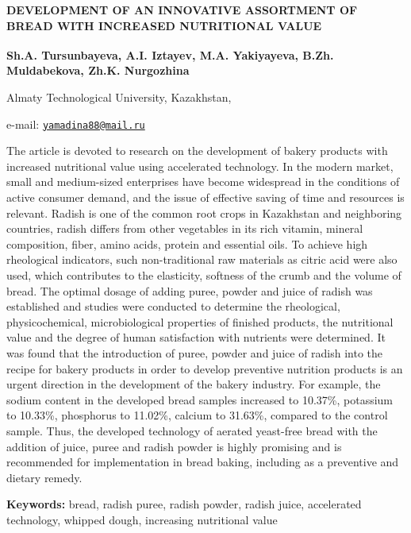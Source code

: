 \begin{articleheader}
{\bfseries DEVELOPMENT OF AN INNOVATIVE ASSORTMENT OF BREAD WITH INCREASED
NUTRITIONAL VALUE}

{\bfseries
Sh.A. Tursunbayeva,
A.I. Iztayev,
M.A. Yakiyayeva\textsuperscript{\envelope },
B.Zh. Muldabekova,
Zh.K. Nurgozhina
}
\end{articleheader}

\begin{affiliation}
Almaty Technological University, Kazakhstan,

e-mail: \href{mailto:yamadina88@mail.ru}{\nolinkurl{yamadina88@mail.ru}}
\end{affiliation}

The article is devoted to research on the development of bakery products
with increased nutritional value using accelerated technology. In the
modern market, small and medium-sized enterprises have become widespread
in the conditions of active consumer demand, and the issue of effective
saving of time and resources is relevant. Radish is one of the common
root crops in Kazakhstan and neighboring countries, radish differs from
other vegetables in its rich vitamin, mineral composition, fiber, amino
acids, protein and essential oils. To achieve high rheological
indicators, such non-traditional raw materials as citric acid were also
used, which contributes to the elasticity, softness of the crumb and the
volume of bread. The optimal dosage of adding puree, powder and juice of
radish was established and studies were conducted to determine the
rheological, physicochemical, microbiological properties of finished
products, the nutritional value and the degree of human satisfaction
with nutrients were determined. It was found that the introduction of
puree, powder and juice of radish into the recipe for bakery products in
order to develop preventive nutrition products is an urgent direction in
the development of the bakery industry. For example, the sodium content
in the developed bread samples increased to 10.37\%, potassium to
10.33\%, phosphorus to 11.02\%, calcium to 31.63\%, compared to the
control sample. Thus, the developed technology of aerated yeast-free
bread with the addition of juice, puree and radish powder is highly
promising and is recommended for implementation in bread baking,
including as a preventive and dietary remedy.

{\bfseries Keywords:} bread, radish puree, radish powder, radish juice,
accelerated technology, whipped dough, increasing nutritional value

